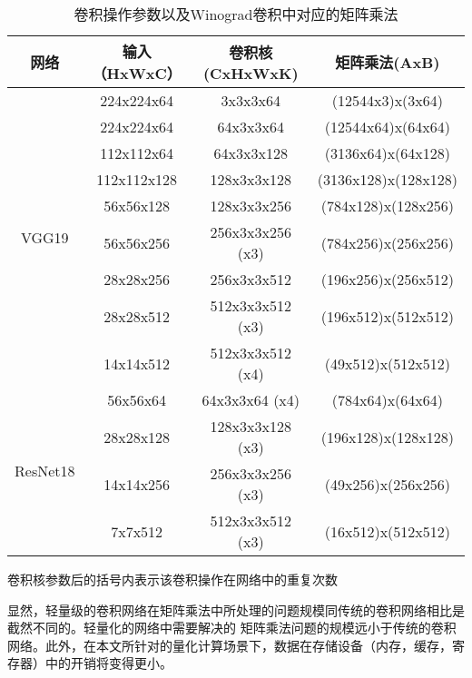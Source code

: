 \begin{table}[]
  \centering
  \begin{threeparttable}
    \caption{卷积操作参数以及Winograd卷积中对应的矩阵乘法}
    \begin{tabular}{cccc}
      \toprule
      网络 & 输入（HxWxC） & 卷积核 (CxHxWxK) & 矩阵乘法(AxB) \\
      \midrule
      \multirow{9}{*}{VGG19} & 224x224x64 & 3x3x3x64 & (12544x3)x(3x64)\\
                            & 224x224x64 & 64x3x3x64 & (12544x64)x(64x64)\\
                            & 112x112x64 &  64x3x3x128 & (3136x64)x(64x128)\\
                            & 112x112x128 &  128x3x3x128 & (3136x128)x(128x128)\\
                            & 56x56x128 & 128x3x3x256 & (784x128)x(128x256)\\
                            & 56x56x256 & 256x3x3x256 (x3) & (784x256)x(256x256)\\
                            & 28x28x256 & 256x3x3x512 & (196x256)x(256x512)\\
                            & 28x28x512 & 512x3x3x512 (x3) & (196x512)x(512x512)\\
                            & 14x14x512 & 512x3x3x512 (x4) & (49x512)x(512x512)\\
      \hline
      \multirow{4}{*}{ResNet18} & 56x56x64 & 64x3x3x64 (x4) & (784x64)x(64x64)\\
                               & 28x28x128 & 128x3x3x128 (x3) & (196x128)x(128x128)\\
                               & 14x14x256 & 256x3x3x256 (x3) & (49x256)x(256x256)\\
                               & 7x7x512 & 512x3x3x512 (x3) & (16x512)x(512x512)\\
      \bottomrule
    \end{tabular}
    \begin{tablenotes}
      \small
      \item 卷积核参数后的括号内表示该卷积操作在网络中的重复次数
    \end{tablenotes}
  \end{threeparttable}
  \label{tbl:conv-matmul}
\end{table}

显然，轻量级的卷积网络在矩阵乘法中所处理的问题规模同传统的卷积网络相比是截然不同的。轻量化的网络中需要解决的
矩阵乘法问题的规模远小于传统的卷积网络。此外，在本文所针对的量化计算场景下，数据在存储设备（内存，缓存，寄存器）中的开销将变得更小。


